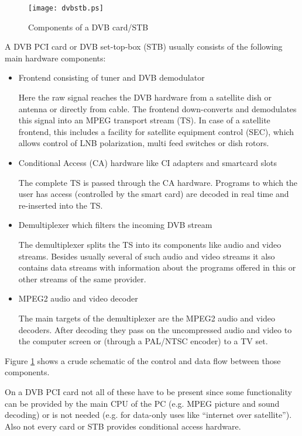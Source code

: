 \begin{figure}[htbp]
  \begin{center}
    \texttt{[image: dvbstb.ps]}
    \caption{Components of a DVB card/STB}
    \label{fig:dvbstb}
  \end{center}
\end{figure}


A DVB PCI card or DVB set-top-box (STB) usually consists of the following
main hardware components:
\begin{itemize}
\item Frontend consisting of tuner and DVB demodulator

Here the raw signal reaches the DVB hardware from a satellite dish or antenna
or directly from cable. The frontend down-converts and demodulates
this signal into an MPEG transport stream (TS). In case of a satellite
frontend, this includes a facility for satellite equipment control (SEC),
which allows control of LNB polarization, multi feed switches or
dish rotors.

\item Conditional Access (CA) hardware like CI adapters and smartcard slots

The complete TS is passed through the CA hardware. Programs to which 
the user has access (controlled by the smart card) are decoded in real
time and re-inserted into the TS. 

\item Demultiplexer which filters the incoming DVB stream

The demultiplexer splits the TS into its components like audio and video 
streams. Besides usually several of such audio and video streams it also 
contains data streams with information about the programs offered in this
or other streams of the same provider.

\item MPEG2 audio and video decoder 

The main targets of the demultiplexer are the MPEG2 audio and video 
decoders. After decoding they pass on the uncompressed audio 
and video to the computer screen or (through a PAL/NTSC encoder) to 
a TV set.
\end{itemize}

Figure \ref{fig:dvbstb} shows a crude schematic of the control and data flow 
between those components.

On a DVB PCI card not all of these have to be present since some 
functionality can be provided by the main CPU of the PC (e.g. MPEG picture
and sound decoding) or is not needed (e.g. for data-only uses like 
``internet over satellite'').
Also not every card or STB provides conditional access hardware.

